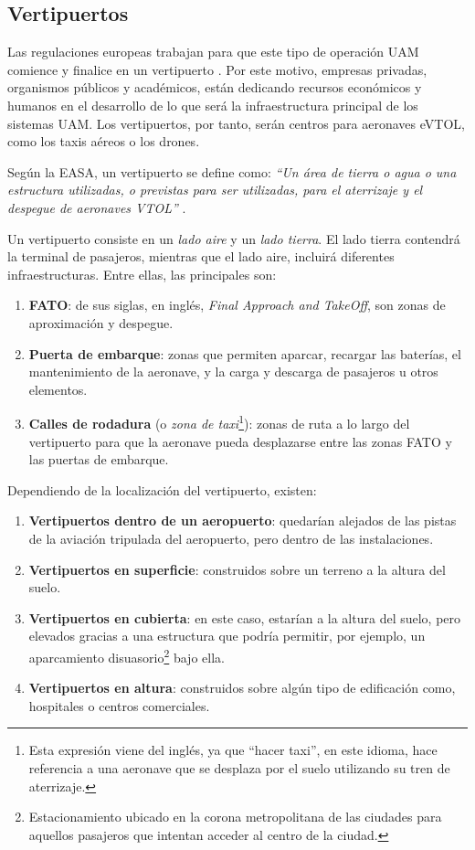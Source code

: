 \documentclass[12pt,a4paper]{book}
\begin{document}
\subsection{Vertipuertos} \label{Subsec: 1_2_2}
Las regulaciones europeas trabajan para que este tipo de operación UAM comience y finalice en un vertipuerto \cite{easa_vertiports_2022}. Por este motivo, empresas privadas, organismos públicos y académicos, están dedicando recursos económicos y humanos en el desarrollo de lo que será la infraestructura principal de los sistemas UAM. Los vertipuertos, por tanto, serán centros para aeronaves eVTOL, como los taxis aéreos o los drones. 

Según la EASA, un vertipuerto se define como: \textsl{``Un área de tierra o agua o una estructura utilizadas, o previstas para ser utilizadas, para el aterrizaje y el despegue de aeronaves VTOL''} \cite{easa_verti_web}.

Un vertipuerto consiste en un \textsl{lado aire} y un \textsl{lado tierra}. El lado tierra contendrá la terminal de pasajeros, mientras que el lado aire, incluirá diferentes infraestructuras. Entre ellas, las principales son:

    \begin{enumerate}
    	\item \textbf{FATO}: de sus siglas, en inglés, \textsl{Final Approach and TakeOff}, son zonas de aproximación y despegue.
    	\item  \textbf{Puerta de embarque}: zonas que permiten aparcar, recargar las baterías, el mantenimiento de la aeronave, y la carga y descarga de pasajeros u otros elementos.
    	\item \textbf{Calles de rodadura} (o \textsl{zona de taxi}\footnote{Esta expresión viene del inglés, ya que ``hacer taxi'', en este idioma, hace referencia a una aeronave que se desplaza por el suelo utilizando su tren de aterrizaje.}): zonas de ruta a lo largo del vertipuerto para que la aeronave pueda desplazarse entre las zonas FATO y las puertas de embarque.
	\end{enumerate}       
   
Dependiendo de la localización del vertipuerto, existen: 
    \begin{enumerate}
    	\item \textbf{Vertipuertos dentro de un aeropuerto}: quedarían alejados de las pistas de la aviación tripulada del aeropuerto, pero dentro de las instalaciones.
     	\item \textbf{Vertipuertos en superficie}: construidos sobre un terreno a la altura del suelo. 
     	\item \textbf{Vertipuertos en cubierta}: en este caso, estarían a la altura del suelo, pero elevados gracias a una estructura que podría permitir, por ejemplo, un aparcamiento disuasorio\footnote{Estacionamiento ubicado en la corona metropolitana de las ciudades para aquellos pasajeros que intentan acceder al centro de la ciudad.} bajo ella. 
     	\item \textbf{Vertipuertos en altura}: construidos sobre algún tipo de edificación como, hospitales o centros comerciales. 
    \end{enumerate}
    
\end{document}
